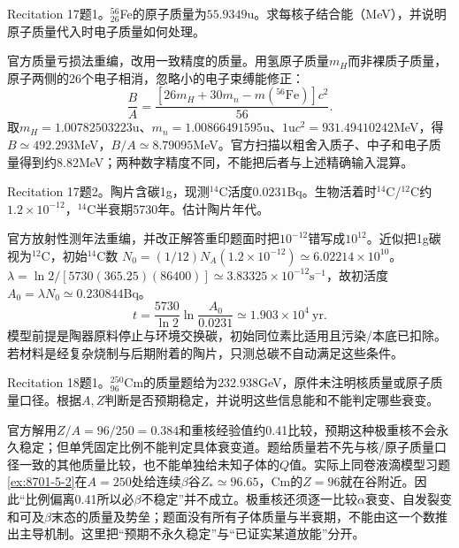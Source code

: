 \begin{exercise}\label{ex:rec-17-1}
Recitation 17题1。$^{56}_{26}$Fe的原子质量为$55.9349$u。求每核子结合能（MeV），并说明原子质量代入时电子质量如何处理。
\end{exercise}
\begin{solution}
官方质量亏损法重编，改用一致精度的质量。用氢原子质量$m_H$而非裸质子质量，原子两侧的26个电子相消，忽略小的电子束缚能修正：
\begin{equation}
\frac BA=\frac{[26m_H+30m_n-m(^{56}\mathrm{Fe})]c^2}{56}.
\end{equation}
取$m_H=1.00782503223$u、$m_n=1.00866491595$u、$1\mathrm u c^2=931.49410242$MeV，得$B\simeq492.293$MeV，$B/A\simeq8.79095$MeV。官方扫描以粗舍入质子、中子和电子质量得到约8.82MeV；两种数字精度不同，不能把后者与上述精确输入混算。
\end{solution}
\begin{exercise}\label{ex:rec-17-2}
Recitation 17题2。陶片含碳1g，现测$^{14}$C活度$0.0231$Bq。生物活着时$^{14}$C/$^{12}$C约$1.2\times10^{-12}$，$^{14}$C半衰期5730年。估计陶片年代。
\end{exercise}
\begin{solution}
官方放射性测年法重编，并改正解答重印题面时把$10^{-12}$错写成$10^{12}$。近似把1g碳视为$^{12}$C，初始$^{14}$C数
$N_0=(1/12)N_A(1.2\times10^{-12})\simeq6.02214\times10^{10}$。
$\lambda=\ln2/[5730(365.25)(86400)]\simeq3.83325\times10^{-12}\mathrm{s}^{-1}$，故初活度$A_0=\lambda N_0\simeq0.230844$Bq。
\begin{equation}t=\frac{5730}{\ln2}\ln\frac{A_0}{0.0231}\simeq1.903\times10^4\ \mathrm{yr}.
\end{equation}
模型前提是陶器原料停止与环境交换碳，初始同位素比适用且污染/本底已扣除。若材料是经复杂烧制与后期附着的陶片，只测总碳不自动满足这些条件。
\end{solution}
\begin{exercise}\label{ex:rec-18-1}
Recitation 18题1。$^{250}_{96}$Cm的质量题给为$232.938$GeV，原件未注明核质量或原子质量口径。根据$A,Z$判断是否预期稳定，并说明这些信息能和不能判定哪些衰变。
\end{exercise}
\begin{solution}
官方解用$Z/A=96/250=0.384$和重核经验值约0.41比较，预期这种极重核不会永久稳定；但单凭固定比例不能判定具体衰变道。题给质量若不先与核/原子质量口径一致的其他质量比较，也不能单独给未知子体的$Q$值。实际上同卷液滴模型习题\ref{ex:8701-5-2}在$A=250$处给连续$\beta$谷$Z_*\simeq96.65$，Cm的$Z=96$就在谷附近。因此“比例偏离0.41所以必$\beta$不稳定”并不成立。极重核还须逐一比较$\alpha$衰变、自发裂变和可及$\beta$末态的质量及势垒；题面没有所有子体质量与半衰期，不能由这一个数推出主导机制。这里把“预期不永久稳定”与“已证实某道放能”分开。
\end{solution}
